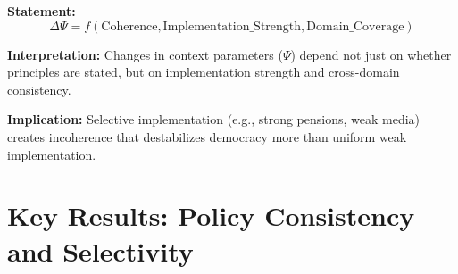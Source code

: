 \begin{tcolorbox}[colback=gray!5!white, colframe=gray!75!black,
    title=Axiom GEN-2: Principle-to-Context Mapping]

\textbf{Statement:}
\begin{equation}
\Delta \Psi = f(\text{Coherence}, \text{Implementation\_Strength}, \text{Domain\_Coverage})
\end{equation}

\textbf{Interpretation:} Changes in context parameters ($\Psi$) depend not just on whether principles are stated, but on implementation strength and cross-domain consistency.

\textbf{Implication:} Selective implementation (e.g., strong pensions, weak media) creates incoherence that destabilizes democracy more than uniform weak implementation.

\end{tcolorbox}


\section{Key Results: Policy Consistency and Selectivity}
\label{sec:bf-results}


